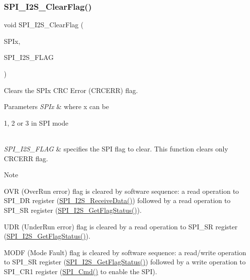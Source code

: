 \subsubsection{\texorpdfstring{S\+P\+I\+\_\+\+I2\+S\+\_\+\+Clear\+Flag()}{SPI\_I2S\_ClearFlag()}}
{\footnotesize\ttfamily void S\+P\+I\+\_\+\+I2\+S\+\_\+\+Clear\+Flag (\begin{DoxyParamCaption}\item[{\hyperlink{struct_s_p_i___type_def}{S\+P\+I\+\_\+\+Type\+Def} $\ast$}]{S\+P\+Ix,  }\item[{uint16\+\_\+t}]{S\+P\+I\+\_\+\+I2\+S\+\_\+\+F\+L\+AG }\end{DoxyParamCaption})}



Clears the S\+P\+Ix C\+RC Error (C\+R\+C\+E\+RR) flag. 


\begin{DoxyParams}{Parameters}
{\em S\+P\+Ix} & where x can be
\begin{DoxyItemize}
\item 1, 2 or 3 in S\+PI mode 
\end{DoxyItemize}\\
\hline
{\em S\+P\+I\+\_\+\+I2\+S\+\_\+\+F\+L\+AG} & specifies the S\+PI flag to clear. This function clears only C\+R\+C\+E\+RR flag. \\
\hline
\end{DoxyParams}
\begin{DoxyNote}{Note}

\begin{DoxyItemize}
\item O\+VR (Over\+Run error) flag is cleared by software sequence\+: a read operation to S\+P\+I\+\_\+\+DR register (\hyperlink{group___s_p_i___private___functions_gab77de76547f3bff403236b263b070a30}{S\+P\+I\+\_\+\+I2\+S\+\_\+\+Receive\+Data()}) followed by a read operation to S\+P\+I\+\_\+\+SR register (\hyperlink{group___s_p_i___private___functions_ga1bd785d129e09c5734a876c8f2767204}{S\+P\+I\+\_\+\+I2\+S\+\_\+\+Get\+Flag\+Status()}).
\item U\+DR (Under\+Run error) flag is cleared by a read operation to S\+P\+I\+\_\+\+SR register (\hyperlink{group___s_p_i___private___functions_ga1bd785d129e09c5734a876c8f2767204}{S\+P\+I\+\_\+\+I2\+S\+\_\+\+Get\+Flag\+Status()}).
\item M\+O\+DF (Mode Fault) flag is cleared by software sequence\+: a read/write operation to S\+P\+I\+\_\+\+SR register (\hyperlink{group___s_p_i___private___functions_ga1bd785d129e09c5734a876c8f2767204}{S\+P\+I\+\_\+\+I2\+S\+\_\+\+Get\+Flag\+Status()}) followed by a write operation to S\+P\+I\+\_\+\+C\+R1 register (\hyperlink{group___s_p_i___private___functions_gaa31357879a65ee1ed7223f3b9114dcf3}{S\+P\+I\+\_\+\+Cmd()} to enable the S\+PI). 
\end{DoxyItemize}
\end{DoxyNote}

